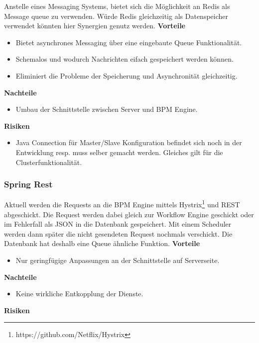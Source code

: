 Anstelle eines Messaging Systems, bietet sich die Möglichkeit an Redis als Message queue zu verwenden. Würde Redis gleichzeitig als Datenspeicher verwendet könnten hier Synergien genutz werden. 
\newline
\newline
\textbf{Vorteile}
\begin{itemize}
	\item Bietet asynchrones Messaging über eine eingebaute Queue Funktionalität.
	\item Schemalos und wodurch Nachrichten eifach gespeichert werden können.
	\item Eliminiert die Probleme der Speicherung und Asynchronität gleichzeitig.
\end{itemize}
\textbf{Nachteile}
\begin{itemize}
	\item Umbau der Schnittstelle zwischen Server und BPM Engine.
\end{itemize}
\textbf{Risiken}
\begin{itemize}
	\item Java Connection für Master/Slave Konfiguration befindet sich noch in der Entwicklung resp. muss selber gemacht werden. Gleiches gilt für die Clusterfunktionalität.
\end{itemize}

\subsubsection{Spring Rest}

Aktuell werden die Requests an die BPM Engine mittels Hystrix\footnote{https://github.com/Netflix/Hystrix} und REST abgeschickt. Die Request werden dabei gleich zur Workflow Engine geschickt oder im Fehlerfall als JSON in die Datenbank gespeichert. Mit einem Scheduler werden dann später die nicht gesendeten Request nochmals verschickt. Die Datenbank hat deshalb eine Queue ähnliche Funktion.
\newline
\newline
\textbf{Vorteile}
\begin{itemize}
	\item Nur geringfügige Anpassungen an der Schnittstelle auf Serverseite.
\end{itemize}
\textbf{Nachteile}
\begin{itemize}
	\item Keine wirkliche Entkopplung der Dienste.
\end{itemize}
\textbf{Risiken}

